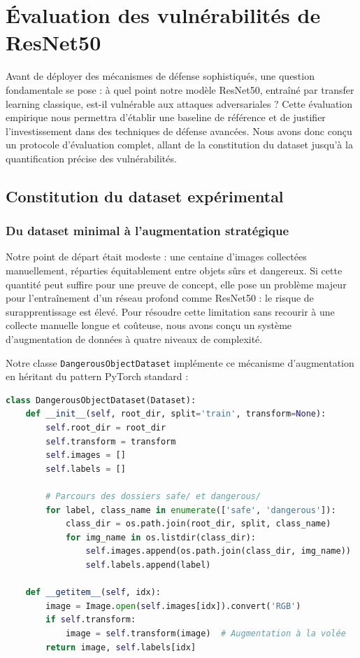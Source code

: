 \section{Évaluation des vulnérabilités de ResNet50}

Avant de déployer des mécanismes de défense sophistiqués, une question fondamentale se pose : à quel point notre modèle ResNet50, entraîné par transfer learning classique, est-il vulnérable aux attaques adversariales ? Cette évaluation empirique nous permettra d'établir une baseline de référence et de justifier l'investissement dans des techniques de défense avancées. Nous avons donc conçu un protocole d'évaluation complet, allant de la constitution du dataset jusqu'à la quantification précise des vulnérabilités.

\subsection{Constitution du dataset expérimental}

\subsubsection{Du dataset minimal à l'augmentation stratégique}

Notre point de départ était modeste : une centaine d'images collectées manuellement, réparties équitablement entre objets sûrs et dangereux. Si cette quantité peut suffire pour une preuve de concept, elle pose un problème majeur pour l'entraînement d'un réseau profond comme ResNet50 : le risque de surapprentissage est élevé. Pour résoudre cette limitation sans recourir à une collecte manuelle longue et coûteuse, nous avons conçu un système d'augmentation de données à quatre niveaux de complexité.

Notre classe \texttt{DangerousObjectDataset} implémente ce mécanisme d'augmentation en héritant du pattern PyTorch standard :

\begin{lstlisting}[language=Python, caption=Classe de chargement avec augmentation stratégique]
class DangerousObjectDataset(Dataset):
    def __init__(self, root_dir, split='train', transform=None):
        self.root_dir = root_dir
        self.transform = transform
        self.images = []
        self.labels = []

        # Parcours des dossiers safe/ et dangerous/
        for label, class_name in enumerate(['safe', 'dangerous']):
            class_dir = os.path.join(root_dir, split, class_name)
            for img_name in os.listdir(class_dir):
                self.images.append(os.path.join(class_dir, img_name))
                self.labels.append(label)

    def __getitem__(self, idx):
        image = Image.open(self.images[idx]).convert('RGB')
        if self.transform:
            image = self.transform(image)  # Augmentation à la volée
        return image, self.labels[idx]
\end{lstlisting}

